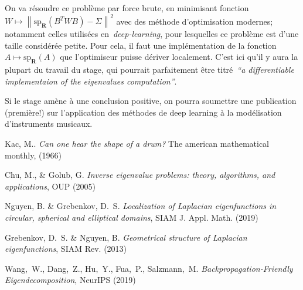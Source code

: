 \documentclass[a4paper,11pt]{article}
\begin{document}
On va résoudre ce problème par force brute, en minimisant
fonction~$W\mapsto\left\|\mathrm{sp}_\mathbf{R}\left(B^TWB\right)-\Sigma\right\|^2$
avec des méthode d'optimisation modernes; notamment celles utilisées
en~\emph{deep-learning}, pour lesquelles ce problème est d'une taille
considérée petite.  Pour cela, il faut une implémentation de la
fonction~$A\mapsto\mathrm{sp}_\mathbf R(A)$ que l'optimiseur puisse dériver
localement.  C'est ici qu'il y aura la plupart du travail du stage, qui
pourrait parfaitement être titré~\emph{``a differentiable implementaion of the
eigenvalues computation''}.

Si le stage amène à une conclusion positive, on pourra soumettre une
publication (première!) sur l'application des méthodes de deep learning à la
modélisation d'instruments musicaux.


\vspace{-1.5em}
\renewcommand{\refname}{\normalsize Références}
%
\begin{thebibliography}{99}
\vspace{-1em}
{\scriptsize
{}
	Kac, M..
	{\it Can one hear the shape of a drum?}
	The american mathematical monthly, (1966)

	Chu, M., \& Golub, G.
	{\it Inverse eigenvalue problems: theory, algorithms, and
	applications}, OUP (2005)

	Nguyen, B. \& Grebenkov, D.~S.
	{\it Localization of Laplacian eigenfunctions in circular, spherical
	and elliptical domains}, SIAM J.  Appl. Math. (2019)

	Grebenkov, D.~S.  \& Nguyen, B.
	{\it Geometrical structure of Laplacian eigenfunctions},
	SIAM Rev. (2013)

	Wang,~W., Dang,~Z., Hu,~Y., Fua,~P., Salzmann,~M.
	{\it Backpropagation-Friendly Eigendecomposition},
	NeurIPS (2019)

}
\end{thebibliography}
\end{document}
